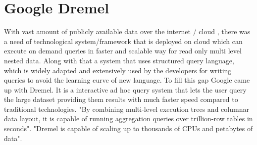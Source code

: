 \section{Google Dremel}

With vast amount of publicly available data over the internet / cloud , there was a need of technological 
system/framework that is deployed on cloud which can execute on demand queries in faster and scalable way 
for read only multi level nested data. Along with that a system that uses structured query language, which
is widely adapted and extensively used by the developers for writing queries to avoid the learning curve of 
new language. To fill this gap Google came up with Dremel. 
It is a interactive ad hoc query system that lets the user query the large dataset providing them results 
with much faster speed compared to traditional technologies\cite{www-dremel}. "By combining multi-level 
execution trees and columnar data layout, it is capable of running aggregation queries over trillion-row 
tables in seconds"\cite{www-dremel}. "Dremel is capable of scaling up to thousands of CPUs and petabytes
of data"\cite{www-dremel}.
